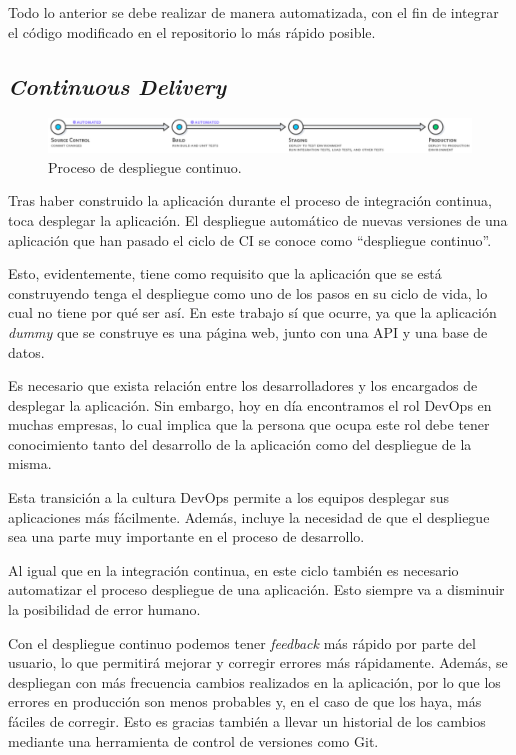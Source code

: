 Todo lo anterior se debe realizar de manera automatizada, con el fin de integrar el código modificado en el repositorio lo más rápido posible.

\subsection*{\textit{Continuous Delivery}}

\begin{figure}
  \centerline{\includegraphics[width=17cm]{figuras/cd}}
  \caption{Proceso de despliegue continuo.\cite{img:cd}}
  \label{fig:cd}
\end{figure}

Tras haber construido la aplicación durante el proceso de integración continua, toca desplegar la aplicación. El despliegue automático de nuevas versiones de una aplicación que han pasado el ciclo de CI se conoce como ``despliegue continuo''.

Esto, evidentemente, tiene como requisito que la aplicación que se está construyendo tenga el despliegue como uno de los pasos en su ciclo de vida, lo cual no tiene por qué ser así. En este trabajo sí que ocurre, ya que la aplicación \textit{dummy} que se construye es una página web, junto con una API y una base de datos.

Es necesario que exista relación entre los desarrolladores y los encargados de desplegar la aplicación. Sin embargo, hoy en día encontramos el rol DevOps\cite{devops} en muchas empresas, lo cual implica que la persona que ocupa este rol debe tener conocimiento tanto del desarrollo de la aplicación como del despliegue de la misma.

Esta transición a la cultura DevOps permite a los equipos desplegar sus aplicaciones más fácilmente. Además, incluye la necesidad de que el despliegue sea una parte muy importante en el proceso de desarrollo.

Al igual que en la integración continua, en este ciclo también es necesario automatizar el proceso despliegue de una aplicación. Esto siempre va a disminuir la posibilidad de error humano.

Con el despliegue continuo podemos tener \textit{feedback} más rápido por parte del usuario, lo que permitirá mejorar y corregir errores más rápidamente. Además, se despliegan con más frecuencia cambios realizados en la aplicación, por lo que los errores en producción son menos probables y, en el caso de que los haya, más fáciles de corregir. Esto es gracias también a llevar un historial de los cambios mediante una herramienta de control de versiones como Git.

